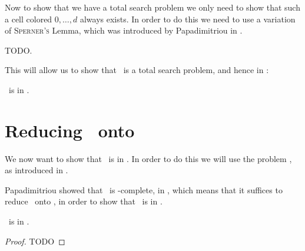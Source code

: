 Now to show that we have a total search problem we only need to show that such a cell colored $0, \dots, d$ always exists. In order to do this we need to use a variation of \textsc{Sperner's} Lemma, which was introduced by Papadimitriou in .
\begin{theorem}
    TODO.
\end{theorem}

This will allow us to show that \Tarskistar\ is a total search problem, and hence in \TFNP:
\begin{theorem}
    \Tarskistar\ is in \TFNP.
\end{theorem}

\section{Reducing \Tarskistar\ onto \PPAD}

We now want to show that \Tarskistar\ is in \PPAD. In order to do this we will use the problem \Sperner, as introduced in .

Papadimitriou showed that \Sperner\ is \PPAD-complete, in \cite{papadimitriou_complexity_1994-1}, which means that it suffices to reduce \Tarskistar\ onto \Sperner, in order to show that \Tarskistar\ is in \PPAD.

\begin{theorem}
    \Tarskistar\ is in \PPAD.
\end{theorem}
\begin{proof}
    TODO
\end{proof}